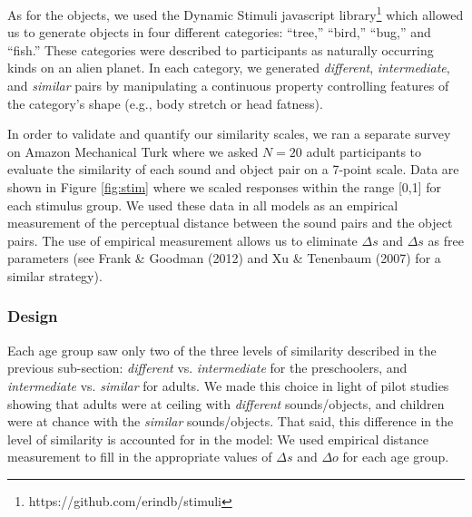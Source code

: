 \documentclass[english,,man]{apa6}
\let\rmarkdownfootnote\footnote%
\def\footnote{\protect\rmarkdownfootnote}
\begin{document}
As for the objects, we used the Dynamic Stimuli javascript library\footnote{https://github.com/erindb/stimuli} which allowed us to generate objects in four different categories: \enquote{tree,} \enquote{bird,} \enquote{bug,} and \enquote{fish.} These categories were described to participants as naturally occurring kinds on an alien planet. In each category, we generated \emph{different}, \emph{intermediate}, and \emph{similar} pairs by manipulating a continuous property controlling features of the category's shape (e.g., body stretch or head fatness).

In order to validate and quantify our similarity scales, we ran a separate survey on Amazon Mechanical Turk where we asked \(N=20\) adult participants to evaluate the similarity of each sound and object pair on a 7-point scale. Data are shown in Figure \ref{fig:stim} where we scaled responses within the range {[}0,1{]} for each stimulus group. We used these data in all models as an empirical measurement of the perceptual distance between the sound pairs and the object pairs. The use of empirical measurement allows us to eliminate \(\Delta s\) and \(\Delta s\) as free parameters (see Frank \& Goodman (2012) and Xu \& Tenenbaum (2007) for a similar strategy).

\hypertarget{design}{%
\subsubsection{Design}\label{design}}

Each age group saw only two of the three levels of similarity described in the previous sub-section: \emph{different} vs. \emph{intermediate} for the preschoolers, and \emph{intermediate} vs. \emph{similar} for adults. We made this choice in light of pilot studies showing that adults were at ceiling with \emph{different} sounds/objects, and children were at chance with the \emph{similar} sounds/objects. That said, this difference in the level of similarity is accounted for in the model: We used empirical distance measurement to fill in the appropriate values of \(\Delta s\) and \(\Delta o\) for each age group.
\end{document}
